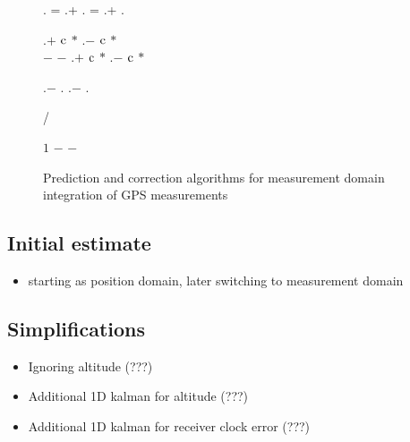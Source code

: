 \begin{figure}[tp]
\begin{algorithm}[H]
{        \BlankLine
        \sv \assign \observation.\sv\;
        \clockDrift = \samplex.\clockDrift + \samplex.\residualDrift{\sv}\;
        \clockOffset = \samplex.\clockOffset + \samplex.\residualOffset{\sv}\;

        \BlankLine
        \pseudorange \assign \samplex.\pseudorange \(+\) \(\mathrm{c}\) \(*\) \sv.\clockOffset \(-\) \(\mathrm{c}\) \(*\) \clockOffset\\
            \hspace{1em} \(-\) \ionoDelay{\sv, \samplex} \(-\) \tropoDelay{\sv, \samplex}\;
        \velocity \assign \samplex.\velocity \(+\) \(\mathrm{c}\) \(*\) \sv.\clockDrift \(-\) \(\mathrm{c}\) \(*\) \clockDrift\;

        \BlankLine
        \userToSv \assign \sv.\position \(-\) \samplex.\position\;
        \relativeVelocity \assign \sv.\velocity \(-\) \samplex.\velocity\;

        \geomRange \assign \abs{\userToSv}\;
        \geomVelocity \assign \dotProduct{\relativeVelocity, \userToSv} / \geomRange\;

        \BlankLine
        \result \assign \(1\)\;
        \rangeError \assign \pseudorange \(-\) \geomRange\;
        \velocityError \assign \velocity \(-\) \geomVelocity\;
        \Return \result\;
    }
\end{algorithm}
\caption{Prediction and correction algorithms for measurement domain integration of GPS measurements}
\label{algo:gps-measurement-domain}
\end{figure}



\subsection{Initial estimate}
\begin{itemize}
\item starting as position domain, later switching to measurement domain
\end{itemize}

\subsection{Simplifications}
\begin{itemize}
\item Ignoring altitude (???)
\item Additional 1D kalman for altitude (???)
\item Additional 1D kalman for receiver clock error (???)
\end{itemize}
